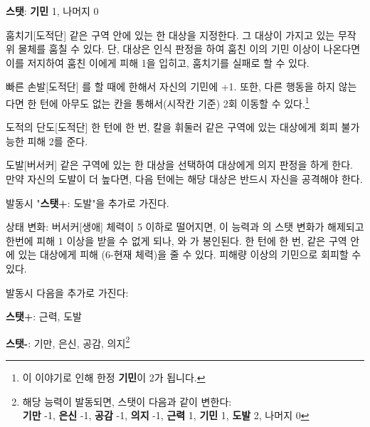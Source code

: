 \documentclass{report}
\begin{document}
	\textbf{스탯}: \textbf{기민} 1, 나머지 0
	
	\begin{spoiler}{훔치기}{[도적단]}
		같은 구역 안에 있는 한 대상을 지정한다. 그 대상이 가지고 있는 무작위 물체를 훔칠 수 있다. 단, 대상은 인식 판정을 하여 훔친 이의 기민 이상이 나온다면 이를 저지하여 훔친 이에게 피해 1을 입히고, 훔치기를 실패로 할 수 있다.
	\end{spoiler}
	
	\begin{spoiler}{빠른 손발}{[도적단]}
		를 할 때에 한해서 자신의 기민에 +1. 또한, 다른 행동을 하지 않는다면 한 턴에 아무도 없는 칸을 통해서(시작칸 기준) 2회 이동할 수 있다.\footnote{이 이야기로 인해  한정 \textbf{기민}이 2가 됩니다.}
	\end{spoiler}
	
	\begin{spoiler}{도적의 단도}{[도적단]}
		한 턴에 한 번, 칼을 휘둘러 같은 구역에 있는 대상에게 회피 불가능한 피해 2를 준다.
	\end{spoiler}
	
	\begin{spoiler}{도발}{[버서커]}
		같은 구역에 있는 한 대상을 선택하여 대상에게 의지 판정을 하게 한다. 만약 자신의 도발이 더 높다면, 다음 턴에는 해당 대상은 반드시 자신을 공격해야 한다.
		
		 발동시 "\textbf{스탯+}: 도발"을 추가로 가진다.
	\end{spoiler}
	
	\begin{spoiler}{상태 변화: 버서커}{[생애]}
		체력이 5 이하로 떨어지면, 이 능력과 의 스탯 변화가 해제되고 한번에 피해 1 이상을 받을 수 없게 되나, 와 가 봉인된다. 한 턴에 한 번, 같은 구역 안에 있는 대상에게 피해 (6-현재 체력)을 줄 수 있다. 피해량 이상의 기민으로 회피할 수 있다.
		
		발동시 다음을 추가로 가진다:
		
		\textbf{스탯+}: 근력, 도발
		
		\textbf{스탯-}: 기만, 은신, 공감, 의지\footnote{해당 능력이 발동되면, 스탯이 다음과 같이 변한다:\\ \textbf{기만} -1, \textbf{은신} -1, \textbf{공감} -1, \textbf{의지} -1, \textbf{근력} 1, \textbf{기민} 1, \textbf{도발} 2, 나머지 0}
	\end{spoiler}
	
\end{document}
